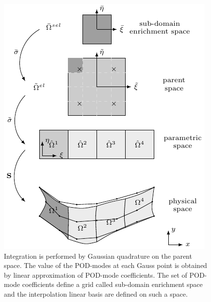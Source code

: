 \documentclass[3p]{article}
\begin{document}
\begin{figure}
\includegraphics[width=1\linewidth]{externals/Pictures/IntegrationXPOD.pdf}
\caption{Integration is performed by Gaussian quadrature on the parent space. The value of the POD-modes at each Gauss point is obtained by linear approximation of POD-mode coefficients. The set of POD-mode coefficients define a grid called sub-domain enrichment space and the interpolation linear basis are defined on such a space.}
\label{fig:IntegrationMappingPODXIgA}
\end{figure}


\end{document}
